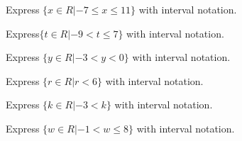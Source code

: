 \documentclass{ximera}
\begin{document}
\begin{exercise}
Express $ \{  x \in R | -7 \leq x \leq 11  \} $ with interval notation.

\begin{multipleChoice}
\choice[correct]{[-7, 11]}
\choice{(-7, 11]}
\choice{[-7, 11)}
\end{multipleChoice}

\end{exercise}





\begin{exercise}
Express$ \{  t \in R | -9 < t \leq 7  \} $ with interval notation. 

\begin{multipleChoice}
\choice{[-9, 7]}
\choice[correct]{(-9, 7]}
\choice{[-9, 7)}
\end{multipleChoice}

\end{exercise}







\begin{exercise}
Express $ \{  y \in R | -3 < y < 0  \} $ with interval notation.

\begin{multipleChoice}
\choice{[-3, 0]}
\choice{(-3, 0]}
\choice{[-3, 0)}
\end{multipleChoice}

\end{exercise}








\begin{exercise}
Express  $ \{  r \in R | r < 6  \} $ with interval notation.

\begin{multipleChoice}
\choice{[$-\infty$, 6]}
\choice{[6, $-\infty$)}
\end{multipleChoice}

\end{exercise}






\begin{exercise}
Express $ \{  k \in R | -3 < k  \} $ with interval notation.

\begin{multipleChoice}
\choice{[-3, $\infty$]}
\choice{[-3, $\infty$)}
\end{multipleChoice}

\end{exercise}





\begin{exercise}
Express $ \{  w \in R | -1 < w \leq 8  \} $ with interval notation.

\begin{multipleChoice}
\choice{[-1, 8]}
\choice{[-1, 8)}
\choice[correct]{(-1, 8]}
\end{multipleChoice}

\end{exercise}
\end{document}
